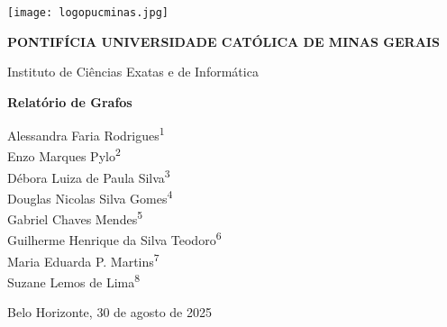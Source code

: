 \documentclass[12pt]{article}
\begin{document}
\begin{titlepage}
    \centering
    \texttt{[image: logopucminas.jpg]}\par\vspace{1cm}
    
    {\bfseries\Large PONTIFÍCIA UNIVERSIDADE CATÓLICA DE MINAS GERAIS\par}
    \vspace{0.3cm}
    {\large Instituto de Ciências Exatas e de Informática\par}
    
    \vfill
    {\bfseries\LARGE Relatório de Grafos\par}
    \vspace{2cm}
    
    {\normalsize
    Alessandra Faria Rodrigues\textsuperscript{1}\\
    Enzo Marques Pylo\textsuperscript{2}\\
    Débora Luiza de Paula Silva\textsuperscript{3}\\
    Douglas Nicolas Silva Gomes\textsuperscript{4}\\
    Gabriel Chaves Mendes\textsuperscript{5}\\
    Guilherme Henrique da Silva Teodoro\textsuperscript{6}\\
    Maria Eduarda P. Martins\textsuperscript{7}\\
    Suzane Lemos de Lima\textsuperscript{8}\\
    }
    
    \vfill
    Belo Horizonte, 30 de agosto de 2025
\end{titlepage}

\begin{abstract}
Este relatório apresenta o desenvolvimento e a implementação de estruturas para a manipulação 
de grafos em linguagem C/C++. A implementação abrange quatro tipos distintos de grafos: (i) 
não direcionado não ponderado; (ii) não direcionado ponderado; (iii) direcionado não ponderado; 
e (iv) direcionado ponderado. São discutidos os detalhes da implementação, com ênfase na 
escolha da lista de adjacência como estrutura de dados para a representação dos grafos, e as 
funcionalidades básicas desenvolvidas para a manipulação de vértices e arestas em cada uma das 
abordagens. 

\textbf{Palavras-chave:} Grafos. Lista de Adjacência. Grafos Ponderados. Grafos Direcionados.
\end{abstract}
\end{document}
